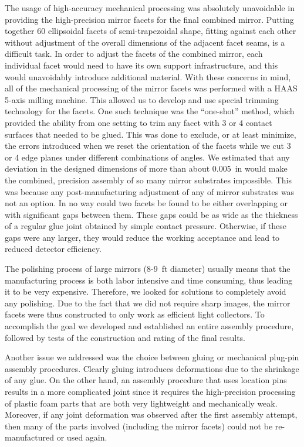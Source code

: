 The usage of high-accuracy mechanical processing was absolutely unavoidable in providing the high-precision
mirror facets for the final combined mirror. Putting together 60 ellipsoidal facets of semi-trapezoidal shape,
fitting against each other without adjustment of the overall dimensions of the adjacent facet seams, is a
difficult task. In order to adjust the facets of the combined mirror, each individual facet would need to have
its own support infrastructure, and this would unavoidably introduce additional material. With these concerns in
mind, all of the mechanical processing of the mirror facets was performed with a HAAS 5-axis milling machine.
This allowed us to develop and use special trimming technology for the facets. One such technique was the
``one-shot'' method, which provided the ability from one setting to trim any facet with 3 or 4 contact surfaces
that needed to be glued. This was done to exclude, or at least minimize, the errors introduced when we reset the
orientation of the facets while we cut 3 or 4 edge planes under different combinations of angles. We estimated
that any deviation in the designed dimensions of more than about 0.005~in would make the combined, precision
assembly of so many mirror substrates impossible. This was because any post-manufacturing adjustment of any
of mirror substrates was not an option. In no way could two facets be found to be either overlapping or with
significant gaps between them. These gaps could be as wide as the thickness of a regular glue joint obtained by
simple contact pressure. Otherwise, if these gaps were any larger, they would reduce the working acceptance
and lead to reduced detector efficiency.

The polishing process of large mirrors (8-9~ft diameter) usually means that the manufacturing process is both
labor intensive and time consuming, thus leading it to be very expensive. Therefore, we looked for solutions to
completely avoid any polishing. Due to the fact that we did not require sharp images, the mirror facets were
thus constructed to only work as efficient light collectors. To accomplish the goal we developed and established
an entire assembly procedure, followed by tests of the construction and rating of the final results.

Another issue we addressed was the choice between gluing or mechanical plug-pin assembly procedures. Clearly
gluing introduces deformations due to the shrinkage of any glue. On the other hand, an assembly procedure that
uses location pins results in a more complicated joint since it requires the high-precision processing of plastic foam
parts that are both very lightweight and mechanically weak. Moreover, if any joint deformation was observed after
the first assembly attempt, then many of the parts involved (including the mirror facets) could not be
re-manufactured or used again.

